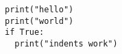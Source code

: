 \documentclass{article}
\begin{document}
\begin{lstlisting}
print("hello")
print("world")
if True:
  print("indents work")
\end{lstlisting}
\end{document}
